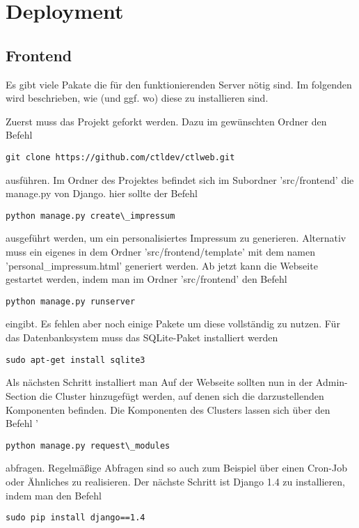 \chapter{Deployment}
\section{Frontend}
Es gibt viele Pakate die für den funktionierenden Server nötig sind. Im folgenden wird beschrieben, wie (und ggf. wo) diese zu installieren sind. 


Zuerst muss das Projekt geforkt werden. Dazu im gewünschten Ordner den Befehl 
\begin{lstlisting}
git clone https://github.com/ctldev/ctlweb.git 
\end{lstlisting}
ausführen. Im Ordner des
Projektes befindet sich im Subordner 'src/frontend' die manage.py von Django.
hier sollte der Befehl 
\begin{lstlisting}
python manage.py create\_impressum
\end{lstlisting}
 ausgeführt werden, um ein personalisiertes Impressum zu generieren. Alternativ muss ein eigenes 
in dem Ordner 'src/frontend/template' mit dem namen
'personal\_impressum.html' generiert werden. Ab jetzt kann die Webseite gestartet
werden, indem man im Ordner 'src/frontend' den Befehl
\begin{lstlisting}
python manage.py runserver 
\end{lstlisting}
eingibt. Es fehlen aber noch einige Pakete um diese vollständig zu nutzen.
Für das Datenbanksystem muss das SQLite-Paket installiert werden
\begin{lstlisting}
sudo apt-get install sqlite3
\end{lstlisting}
Als nächsten Schritt installiert man 
Auf der Webseite sollten nun in der Admin-Section die Cluster hinzugefügt werden,
auf denen sich die darzustellenden Komponenten befinden. Die Komponenten des
Clusters lassen sich über den Befehl '
\begin{lstlisting}
python manage.py request\_modules
\end{lstlisting}
abfragen. Regelmäßige Abfragen sind so auch zum Beispiel über einen Cron-Job
oder Ähnliches zu realisieren.
\newpage
Der nächste Schritt ist Django 1.4 zu installieren, indem man den Befehl
\begin{lstlisting}
sudo pip install django==1.4
\end{lstlisting}

